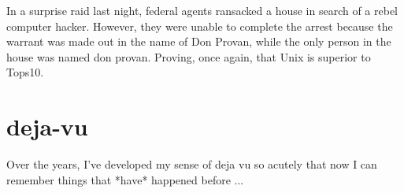 \setcounter{equation}{0} 

In a surprise raid last night, federal agents ransacked a house in search
of a rebel computer hacker.  However, they were unable to complete the arrest
because the warrant was made out in the name of Don Provan, while the only
person in the house was named don provan.  Proving, once again, that Unix is
superior to Tops10.

\section{deja-vu}

Over the years, I've developed my sense of deja vu so acutely that now
I can remember things that *have* happened before ...


